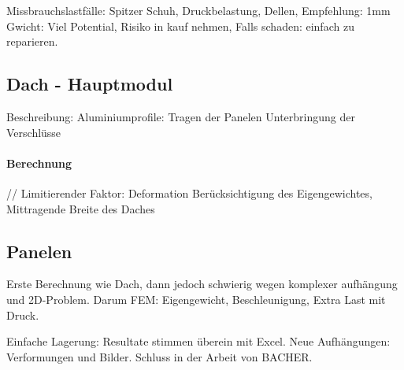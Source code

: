 Missbrauchslastfälle: Spitzer Schuh, Druckbelastung, Dellen,
Empfehlung: 1mm Gwicht: Viel Potential, Risiko in kauf nehmen, Falls schaden: einfach zu reparieren.




\subsection{Dach - Hauptmodul}
Beschreibung:
  Aluminiumprofile: Tragen der Panelen
  Unterbringung der Verschlüsse

  \paragraph{Berechnung}\mbox{}//
    Limitierender Faktor: Deformation
    Berücksichtigung des Eigengewichtes,
    Mittragende Breite des Daches


\subsection{Panelen}
  Erste Berechnung wie Dach, dann jedoch schwierig wegen komplexer aufhängung und 2D-Problem.
  Darum FEM:
    Eigengewicht, Beschleunigung, Extra Last mit Druck.

  Einfache Lagerung: Resultate stimmen überein mit Excel.
  Neue Aufhängungen:
    Verformungen und Bilder.
    Schluss in der Arbeit von BACHER.
